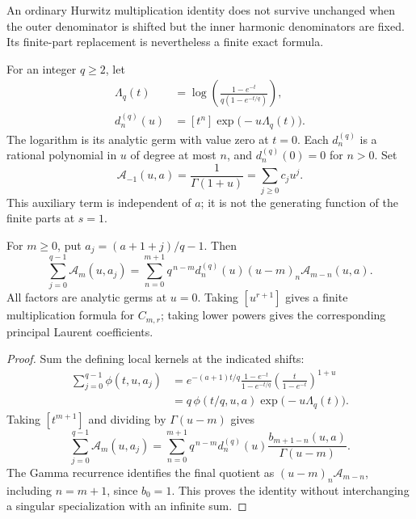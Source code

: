 An ordinary Hurwitz multiplication identity does not survive unchanged
when the outer denominator is shifted but the inner harmonic
denominators are fixed. Its finite-part replacement is nevertheless a
finite exact formula.

For an integer \(q\geq2\), let
\begin{equation}\label{harm:eq:dq}
 \begin{split}
 \Lambda_q(t)&=\log\left(
       \frac{1-e^{-t}}{q(1-e^{-t/q})}\right),\\
 d_n^{(q)}(u)&=[t^n]\exp\bigl(-u\Lambda_q(t)\bigr).
 \end{split}
\end{equation}
The logarithm is its analytic germ with value zero at \(t=0\).
Each \(d_n^{(q)}\) is a rational polynomial in \(u\) of degree at most
\(n\), and \(d_n^{(q)}(0)=0\) for \(n>0\). Set
\[
 \mathcal A_{-1}(u,a)=\frac{1}{\Gamma(1+u)}
                    =\sum_{j\geq0}c_j u^j.
\]
This auxiliary term is independent of \(a\); it is not the generating
function of the finite parts at \(s=1\).

\begin{theorem}
\label{harm:thm:multiplication}
For \(m\geq0\), put \(a_j=(a+1+j)/q-1\). Then
\begin{equation}\label{harm:eq:multiplication}
 \sum_{j=0}^{q-1}\mathcal A_m(u,a_j)
 =\sum_{n=0}^{m+1}
       q^{\,n-m}d_n^{(q)}(u)(u-m)_n
                     \mathcal A_{m-n}(u,a).
\end{equation}
All factors are analytic germs at \(u=0\). Taking \([u^{r+1}]\)
gives a finite multiplication formula for \(C_{m,r}\); taking lower
powers gives the corresponding principal Laurent coefficients.
\end{theorem}

\begin{proof}
Sum the defining local kernels at the indicated shifts:
\[
 \begin{split}
 \sum_{j=0}^{q-1}\phi(t,u,a_j)
 &=e^{-(a+1)t/q}
       \frac{1-e^{-t}}{1-e^{-t/q}}
       \left(\frac{t}{1-e^{-t}}\right)^{1+u}\\
 &=q\,\phi(t/q,u,a)\exp\bigl(-u\Lambda_q(t)\bigr).
 \end{split}
\]
Taking \([t^{m+1}]\) and dividing by \(\Gamma(u-m)\) gives
\[
 \sum_{j=0}^{q-1}\mathcal A_m(u,a_j)
 =\sum_{n=0}^{m+1}q^{\,n-m}d_n^{(q)}(u)
       \frac{b_{m+1-n}(u,a)}{\Gamma(u-m)}.
\]
The Gamma recurrence identifies the final quotient as
\((u-m)_n\mathcal A_{m-n}\), including \(n=m+1\), since
\(b_0=1\). This proves the identity without interchanging a
singular specialization with an infinite sum.
\end{proof}

